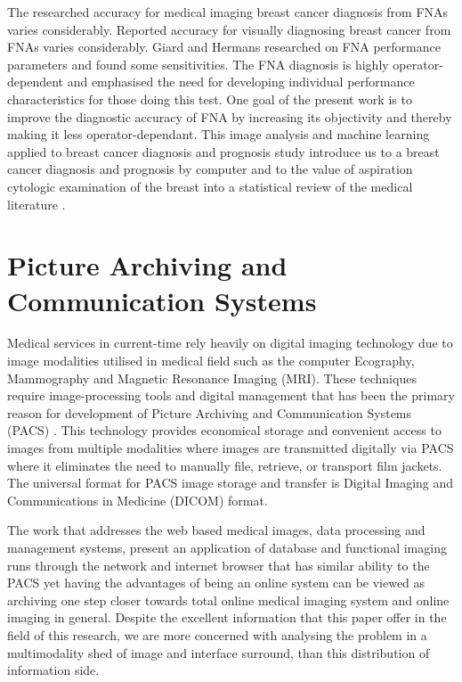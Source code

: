 \clearpage

The researched accuracy for medical imaging breast cancer diagnosis from FNAs varies considerably. Reported accuracy for visually diagnosing breast cancer from FNAs varies considerably. Giard and Hermans \cite{Robertson04scalablefabric} researched on FNA performance parameters and found some sensitivities. The FNA diagnosis is highly operator-dependent and emphasised the need for developing individual performance characteristics for those doing this test. One goal of the present work is to improve the diagnostic accuracy of FNA by increasing its objectivity and thereby making it less operator-dependant. This image analysis and machine learning applied to breast cancer diagnosis and prognosis \cite{citeulike:4920996} study introduce us to a breast cancer diagnosis and prognosis by computer and to the value of aspiration cytologic examination of the breast into a statistical review of the medical literature \cite{Robertson04scalablefabric:}.

\section{Picture Archiving and Communication Systems}

Medical services in current-time rely heavily on digital imaging technology due to image modalities utilised in medical field such as the computer Ecography, Mammography and Magnetic Resonance Imaging (MRI). These techniques require image-processing tools and digital management that has been the primary reason for development of Picture Archiving and Communication Systems (PACS) \cite{oosterwijk2004pacs}. This technology provides economical storage and convenient access to images from multiple modalities where images are transmitted digitally via PACS where it eliminates the need to manually file, retrieve, or transport film jackets. The universal format for PACS image storage and transfer is Digital Imaging and Communications in Medicine (DICOM) \cite{mustra2008overview} format.

The work that addresses the web based medical images, data processing and management systems, present an application of database and functional imaging \cite{kim2000web} runs through the network and internet browser that has similar ability to the PACS yet having the advantages of being an online system can be viewed as archiving one step closer towards total online medical imaging system and online imaging in general. Despite the excellent information that this paper offer in the field of this research, we are more concerned with analysing the problem in a multimodality shed of image and interface surround, than this distribution of information side.

